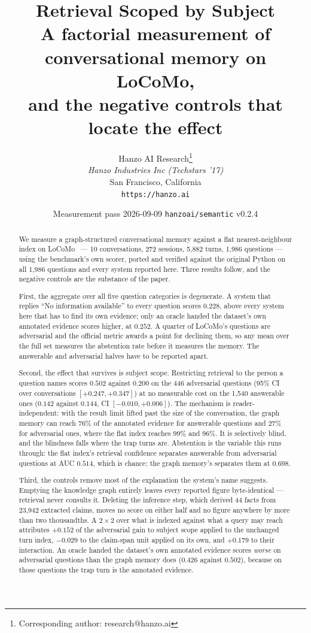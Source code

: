 \documentclass[11pt]{article}
\title{Retrieval Scoped by Subject\\[0.35em]
{\large A factorial measurement of conversational memory on LoCoMo,\\
and the negative controls that locate the effect}}
\author{
    Hanzo AI Research\thanks{Corresponding author: research@hanzo.ai} \\
    \textit{Hanzo Industries Inc (Techstars '17)} \\
    San Francisco, California \\
    \texttt{https://hanzo.ai}
}
\date{Measurement pass 2026-09-09 \quad \texttt{hanzoai/semantic} v0.2.4}
\begin{document}
\hanzocoverpage
\maketitle

\begin{abstract}
\noindent
We measure a graph-structured conversational memory against a flat
nearest-neighbour index on LoCoMo~\cite{locomo} --- 10 conversations, 272
sessions, 5{,}882 turns, 1{,}986 questions --- using the benchmark's own
scorer, ported and verified against the original Python on all 1{,}986
questions and every system reported here. Three results follow, and the negative
controls are the substance of the paper.

First, the aggregate over all five question categories is degenerate. A system
that replies ``No information available'' to every question scores $0.228$,
above every system here that has to find its own evidence; only an oracle
handed the dataset's own annotated evidence scores higher, at $0.252$. A
quarter of LoCoMo's questions are adversarial and the official metric awards a
point for declining them, so any mean over the full set measures the abstention
rate before it measures the memory. The answerable and adversarial halves have
to be reported apart.

Second, the effect that survives is subject scope. Restricting retrieval to
the person a question names scores $0.502$ against $0.200$ on the 446
adversarial questions (95\% CI over conversations $[+0.247, +0.347]$) at no
measurable cost on the 1{,}540 answerable ones ($0.142$ against $0.144$, CI
$[-0.010, +0.006]$). The mechanism is reader-independent: with the result limit
lifted past the size of the conversation, the graph memory can reach $76\%$ of
the annotated evidence for answerable questions and $27\%$ for adversarial ones,
where the flat index reaches $99\%$ and $96\%$. It is selectively blind, and
the blindness falls where the trap turns are. Abstention is the variable this
runs through: the flat index's retrieval confidence separates answerable from
adversarial questions at AUC $0.514$, which is chance; the graph memory's
separates them at $0.698$.

Third, the controls remove most of the explanation the system's name suggests.
Emptying the knowledge graph entirely leaves every reported figure
byte-identical --- retrieval never consults it. Deleting the inference step,
which derived 44 facts from 23{,}942 extracted claims, moves no score on either
half and no figure anywhere by more than two thousandths. A $2\times2$ over what is indexed against what a query may reach
attributes $+0.152$ of the adversarial gain to subject scope applied to the
unchanged turn index, $-0.029$ to the claim-span unit applied on its own, and
$+0.179$ to their interaction. An oracle handed
the dataset's own annotated evidence scores \emph{worse} on adversarial
questions than the graph memory does ($0.426$ against $0.502$), because on those
questions the trap turn is the annotated evidence.


\end{abstract}
\end{document}
